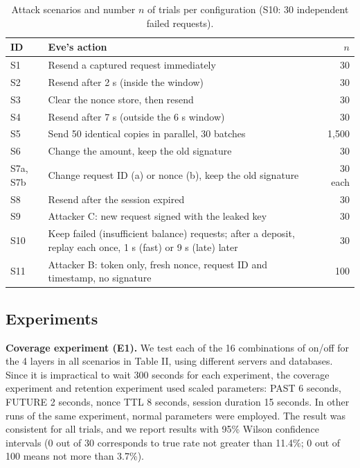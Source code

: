 \documentclass[conference]{IEEEtran}
\begin{document}
\begin{table}[!t]
\caption{Attack scenarios and number $n$ of trials per configuration (S10: 30 independent failed requests).}
\label{tab:attacks}
\centering
\scriptsize
\renewcommand{\arraystretch}{1.1}
\setlength{\tabcolsep}{3pt}
\begin{tabular}{@{}l p{2.3in} r@{}}
\toprule
ID & Eve's action & $n$ \\
\midrule
S1 & Resend a captured request immediately & 30 \\
S2 & Resend after 2 s (inside the window) & 30 \\
S3 & Clear the nonce store, then resend & 30 \\
S4 & Resend after 7 s (outside the 6 s window) & 30 \\
S5 & Send 50 identical copies in parallel, 30 batches & 1,500 \\
S6 & Change the amount, keep the old signature & 30 \\
S7a, S7b & Change request ID (a) or nonce (b), keep the old signature & 30 each \\
S8 & Resend after the session expired & 30 \\
S9 & Attacker C: new request signed with the leaked key & 30 \\
S10 & Keep failed (insufficient balance) requests; after a deposit, replay each once, 1 s (fast) or 9 s (late) later & 30 \\
S11 & Attacker B: token only, fresh nonce, request ID and timestamp, no signature & 100 \\
\bottomrule
\end{tabular}
\end{table}

\subsection{Experiments}
\textbf{Coverage experiment (E1).} We test each of the 16 combinations of on/off for the 4 layers in all scenarios in Table II, using different servers and databases. Since it is impractical to wait 300 seconds for each experiment, the coverage experiment and retention experiment used scaled parameters: PAST 6 seconds, FUTURE 2 seconds, nonce TTL 8 seconds, session duration 15 seconds. In other runs of the same experiment, normal parameters were employed. The result was consistent for all trials, and we report results with 95\% Wilson confidence intervals (0 out of 30 corresponds to true rate not greater than 11.4\%; 0 out of 100 means not more than 3.7\%).
\end{document}
